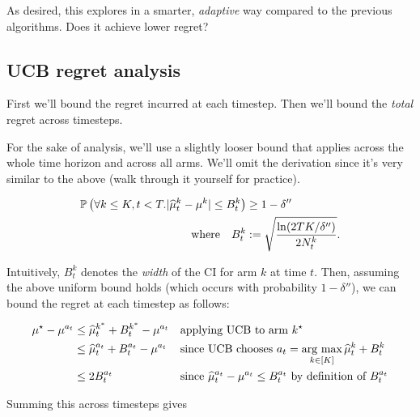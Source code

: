 \documentclass[\main/main]{subfiles}
\begin{document}
As desired, this explores in a smarter, \emph{adaptive} way compared to the previous algorithms. Does it achieve lower regret?

\subsection{UCB regret analysis}

First we'll bound the regret incurred at each timestep. Then we'll bound the \emph{total} regret across timesteps.

For the sake of analysis, we'll use a slightly looser bound that applies across the whole time horizon and across all arms. We'll omit the derivation since it's very similar to the above (walk through it yourself for practice).

\begin{align*}
    \P\left(\forall k \le K, t < T. |\hat \mu^k_t - \mu^k | \le B^k_t \right) & \ge 1-\delta''                              \\
    \text{where} \quad B^k_t                                                  & := \sqrt{\frac{\ln(2TK/\delta'')}{2N^k_t}}.
\end{align*}

Intuitively, $B^k_t$ denotes the \emph{width} of the CI for arm $k$ at time $t$. Then, assuming the above uniform bound holds (which occurs with probability $1-\delta''$), we can bound the regret at each timestep as follows:

\begin{align*}
    \mu^\star - \mu^{a_t} & \le \hat \mu^{k^*}_t + B_t^{k^*} - \mu^{a_t} &  & \text{applying UCB to arm } k^\star                                                          \\
                          & \le \hat \mu^{a_t}_t + B^{a_t}_t - \mu^{a_t} &  & \text{since UCB chooses } a_t = \argmax_{k \in [K]} \hat \mu^k_t + B_t^{k}                   \\
                          & \le 2 B^{a_t}_t                              &  & \text{since } \hat \mu^{a_t}_t - \mu^{a_t} \le B^{a_t}_t \text{ by definition of } B^{a_t}_t \\
\end{align*}

Summing this across timesteps gives
\end{document}
